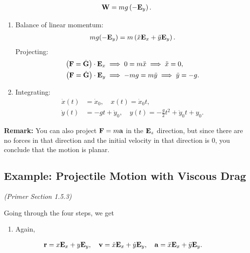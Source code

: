 \documentclass[
  letterpaper,
  DIV=11,
  numbers=noendperiod]{scrreprt}
\providecommand{\tightlist}{%
  \setlength{\itemsep}{0pt}\setlength{\parskip}{0pt}}
\newcommand{\lp}{\left(}
\newcommand{\rp}{\right)}
\begin{document}
\begin{align}
    {\bf W} = mg\lp-{\bf E}_y\rp.
\end{align}

\begin{enumerate}
\def\labelenumi{\arabic{enumi}.}
\setcounter{enumi}{2}
\item
  Balance of linear momentum: \begin{align}
   mg(-{\bf E}_y) = m\lp\ddot{x}{\bf E}_x+\ddot{y}{\bf E}_y\rp.
  \end{align} Projecting: \begin{align}
   \lp{\bf F}=\dot{\bf G}\rp\cdot{\bf E}_x &\implies 0 = m\ddot{x} \implies \ddot{x} = 0,\\
   \lp{\bf F}=\dot{\bf G}\rp\cdot{\bf E}_y &\implies -mg = m\ddot{y} \implies \ddot{y} = -g.
  \end{align}
\item
  Integrating: \begin{align}
   \dot{x}(t) &= \dot{x}_0, \quad x(t) = \dot{x}_0 t,\\
   \dot{y}(t) &= -gt+\dot{y}_0, \quad y(t) = -\frac{g}{2}t^2+\dot{y}_0 t+y_0.
  \end{align}
\end{enumerate}

\textbf{Remark:} You can also project \({\bf F} = m{\bf a}\) in the
\({\bf E}_z\) direction, but since there are no forces in that direction
and the initial velocity in that direction is 0, you conclude that the
motion is planar.

\subsection{Example: Projectile Motion with Viscous
Drag}\label{example-projectile-motion-with-viscous-drag}

\emph{(Primer Section 1.5.3)}

Going through the four steps, we get

\begin{enumerate}
\def\labelenumi{\arabic{enumi}.}
\tightlist
\item
  Again,
\end{enumerate}

\begin{align}
    {\bf r} &= x{\bf E}_x+y{\bf E}_y, \quad {\bf v} = \dot{x}{\bf E}_x+\dot{y}{\bf E}_y, \quad {\bf a} = \ddot{x}{\bf E}_x+\ddot{y}{\bf E}_y.
\end{align}
\end{document}
